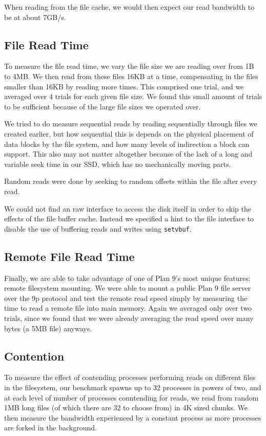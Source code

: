 \documentclass[letterpaper,twocolumn,10pt]{article}
\begin{document}
When reading from the file cache, we would then expect our read bandwidth to be
at about 7GB/s.

\subsection{File Read Time}
To measure the file read time, we vary the file size we are reading over from
1B to 4MB. We then read from these files 16KB at a time, compensating in the
files smaller than 16KB by reading more times. This comprised one trial, and we
averaged over 4 trials for each given file size. We found this small amount of
trials to be sufficient because of the large file sizes we operated over.

We tried to do measure sequential reads by reading sequentially through files
we created earlier, but how sequential this is depends on the physical
placement of data blocks by the file system, and how many levels of indirection
a block can support. This also may not matter altogether because of the lack of
a long and variable seek time in our SSD, which has no mechanically moving
parts.

Random reads were done by seeking to random offsets within the file after every
read. 

We could not find an raw interface to access the disk itself in order to skip
the effects of the file buffer cache. Instead we specified a hint to the file
interface to disable the use of buffering reads and writes using
\texttt{setvbuf}.

\subsection{Remote File Read Time}
Finally, we are able to take advantage of one of Plan 9's most unique features:
remote filesystem mounting. We were able to mount a public Plan 9 file server
over the 9p protocol and test the remote read speed simply by measuring the
time to read a remote file into main memory. Again we averaged only over two
trials, since we found that we were already averaging the read speed over many
bytes (a 5MB file) anyways.

\subsection{Contention}
To measure the effect of contending processes performing reads on different
files in the filesystem, our benchmark spawns up to 32 processes in powers of
two, and at each level of number of processes conntending for reads, we read
from random 1MB long files (of which there are 32 to choose from) in 4K sized 
chunks. We then measure the bandwidth experienced by a constant process as more
processes are forked in the background.
\end{document}
